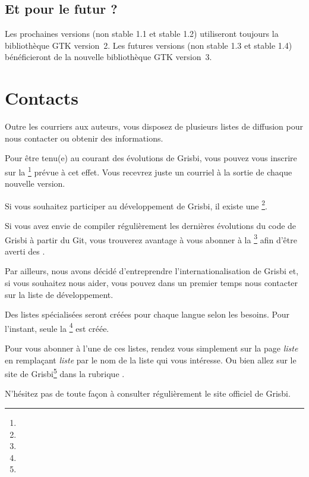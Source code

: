 \subsection{Et pour le futur ?}

Les prochaines versions (non stable 1.1 et stable 1.2) utiliseront toujours la bibliothèque \gls{GTK} version~2.
Les futures versions (non stable 1.3 et stable 1.4) bénéficieront de la nouvelle  bibliothèque GTK version~3.


\section{Contacts\label{introduction-contacts}}


Outre les courriers aux auteurs, vous disposez de plusieurs listes de diffusion 
pour nous contacter ou obtenir des informations.

Pour être tenu(e) au courant des évolutions de Grisbi, vous pouvez vous inscrire 
sur la \footnote{\urlListInfoEmail{}} prévue à cet effet. 
Vous recevrez juste un courriel à la sortie de chaque nouvelle version.

Si vous souhaitez participer au développement de Grisbi, il existe une \footnote{\urlListDevelEmail{}}.

Si vous avez envie de compiler régulièrement les dernières évolutions du code de Grisbi à partir du \gls{Git}, vous trouverez avantage à vous abonner à la \footnote{\urlListCVSEmail{}} afin d'être averti des
.

Par ailleurs, nous avons décidé d'entreprendre l'internationalisation de Grisbi
et, si vous souhaitez nous aider, vous pouvez dans un premier temps nous contacter sur la liste de développement.

Des listes spécialisées seront créées pour chaque langue selon les besoins.
Pour l'instant, seule la \footnote{\urlListAnglaiseEmail{}} est créée.

Pour vous abonner à l'une de ces listes, rendez vous simplement sur la page
\urlListSF{}\emph{liste} en remplaçant \emph{liste} par le nom de la liste qui vous intéresse. Ou bien allez sur le site de {Grisbi}\footnote{\urlGrisbi{}} dans la rubrique .

N'hésitez pas de toute façon à consulter régulièrement le site officiel de Grisbi.

\newpage


